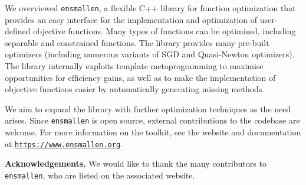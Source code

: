 \documentclass{article}
\begin{document}
We overviewed {\tt ensmallen}, a flexible C++ library for function
optimization that provides an easy interface for the implementation and optimization
of user-defined objective functions.  Many types of functions can be optimized,
including separable and constrained functions.
The library provides many pre-built optimizers (including numerous variants
of SGD and Quasi-Newton optimizers).
The library internally exploits template metaprogramming
to maximise opportunities for efficiency gains,
as well as 
to make the implementation of objective functions easier
by automatically generating missing methods.


We aim to expand the library with further optimization techniques
as the need arises.  Since {\tt ensmallen} is open source,
external contributions to the codebase are welcome.
For more information on the
toolkit, see the website and documentation at
\href{https://www.ensmallen.org}{\tt\small https://www.ensmallen.org}.


{\bf Acknowledgements.}
We would like to thank the many contributors to {\tt ensmallen},
who are listed on the associated website.

% 





\end{document}
